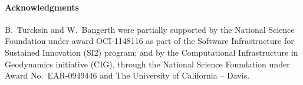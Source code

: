 \documentclass{article}
\begin{document}
\paragraph*{Acknowledgments}
B.~Turcksin and W.~Bangerth were partially supported by the National Science
Foundation under award OCI-1148116 as part of the Software Infrastructure for
Sustained Innovation (SI2) program; and by the Computational
Infrastructure in Geodynamics initiative (CIG), through the National Science
Foundation under Award No.~EAR-0949446 and The University of California --
Davis.



\end{document}
